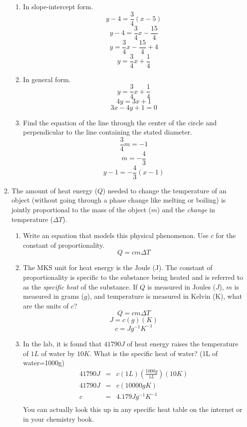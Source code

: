 \documentclass[letterpaper,12pt,fleqn]{article}
\begin{document}
\begin{enumerate}
\begin{enumerate}
\item{In slope-intercept form.}
\[y-4=\frac{3}{4}(x-5)\]
\[y-4=\frac{3}{4}x-\frac{15}{4}\]
\[y=\frac{3}{4}x-\frac{15}{4}+4\]
\[y=\frac{3}{4}x+\frac{1}{4}\]

\item{In general form.}
\[y=\frac{3}{4}x+\frac{1}{4}\]
\[4y=3x+1\]
\[3x-4y+1=0\]

\item{Find the equation of the line through the center of the circle and
perpendicular to the line containing the stated diameter.}
\[\frac{3}{4}m=-1\]
\[m=-\frac{4}{3}\]
\[y-1=-\frac{4}{3}(x-1)\]
\end{enumerate}

\item The amount of heat energy ($Q$) needed to change the temperature of an
object (without going through a phase change like melting or boiling) is jointly
proportional to the mass of the object ($m$) and the \emph{change} in
temperature ($\Delta T$).
\begin{enumerate}
\item Write an equation that models this physical phenomenon. Use $c$ for the
constant of proportionality.
\[Q=cm\Delta T\]

\item The MKS unit for heat energy is the Joule (J). The constant of
proportionality is specific to the substance being heated and is referred to as
the \emph{specific heat} of the substance. If $Q$ is measured in Joules ($J$),
$m$ is measured in grams ($g$), and temperature is measured in Kelvin (K), what
are the units of $c$?
\[Q=cm\Delta T\]
\[J=c(g)(K)\]
\[c=Jg^{-1}K^{-1}\]

\item In the lab, it is found that $41790J$ of heat energy raises the
temperature of $1L$ of water by $10K$. What is the specific heat of water?
(1L of water=1000g)
\begin{eqnarray*}
41790J &=& c(1L)\left(\frac{1000g}{1L}\right)(10K) \\
41790J &=& c(10000gK) \\
c &=& 4.179 Jg^{-1}K^{-1} \\
\end{eqnarray*}
You can actually look this up in any specific heat table on the internet or in
your chemistry book.
\end{enumerate}

\bigskip


\end{enumerate}
\end{document}

